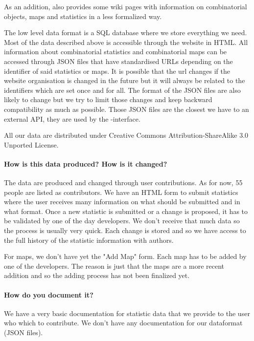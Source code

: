As an addition, \FindStat also provides some wiki pages with information on combinatorial objects, maps and statistics in a less formalized way.

The low level data format is a SQL database where we store everything we need. Most of the data described above is accessible through the website in HTML. All information about combinatorial statistics and combinatorial maps can be accessed through JSON files that have standardised URLs depending on the identifier of said statistics or maps. It is possible that the url changes if the website organisation is changed in the future but it will always be related to the identifiers which are set once and for all. The format of the JSON files are also likely to change but we try to limit those changes and keep backward compatibility as much as possible. Those JSON files are the closest we have to an external API, they are used by the \SageMath-\FindStat interface.

All our data are distributed under Creative Commons Attribution-ShareAlike 3.0 Unported License.

\paragraph{How is this data produced?  How is it changed?}

The data are produced and changed through user contributions. As for now, 55 people are listed as contributors. We have an HTML form to submit statistics where the user receives many information on what should be submitted and in what format. Once a new statistic is submitted or a change is proposed, it has to be validated by one of the day developers. We don't receive that much data so the process is usually very quick. Each change is stored and so we have access to the full history of the statistic information with authors.

For maps, we don't have yet the "Add Map" form. Each map has to be added by one of the \FindStat developers. The reason is just that the maps are a more recent addition and so the adding process has not been finalized yet.

\paragraph{How do you document it?}

We have a very basic documentation for statistic data that we provide to the user who which to contribute. We don't have any documentation for our dataformat (JSON files).

